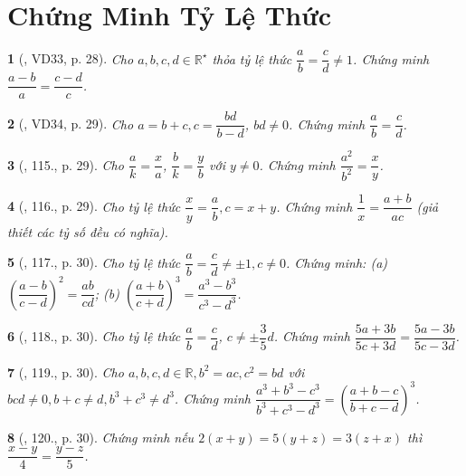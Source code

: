\documentclass{article}
\newtheorem{baitoan}{}
\begin{document}
\section{Chứng Minh Tỷ Lệ Thức}

\begin{baitoan}[\cite{Tuyen_Toan_7}, VD33, p. 28]
	Cho $a,b,c,d\in\mathbb{R}^\star$ thỏa tỷ lệ thức $\dfrac{a}{b} = \dfrac{c}{d}\ne 1$. Chứng minh $\dfrac{a - b}{a} = \dfrac{c - d}{c}$.
\end{baitoan}

\begin{baitoan}[\cite{Tuyen_Toan_7}, VD34, p. 29]
	Cho $a = b + c,c = \dfrac{bd}{b - d}$, $bd\ne 0$. Chứng minh $\dfrac{a}{b} = \dfrac{c}{d}$.
\end{baitoan}

\begin{baitoan}[\cite{Tuyen_Toan_7}, 115., p. 29]
	Cho $\dfrac{a}{k} = \dfrac{x}{a}$, $\dfrac{b}{k} = \dfrac{y}{b}$ với $y\ne 0$. Chứng minh $\dfrac{a^2}{b^2} = \dfrac{x}{y}$.
\end{baitoan}

\begin{baitoan}[\cite{Tuyen_Toan_7}, 116., p. 29]
	Cho tỷ lệ thức $\dfrac{x}{y} = \dfrac{a}{b},c = x + y$. Chứng minh $\dfrac{1}{x} = \dfrac{a + b}{ac}$ (giả thiết các tỷ số đều có nghĩa).
\end{baitoan}

\begin{baitoan}[\cite{Tuyen_Toan_7}, 117., p. 30]
	Cho tỷ lệ thức $\dfrac{a}{b} = \dfrac{c}{d}\ne\pm 1,c\ne 0$. Chứng minh: (a) $\left(\dfrac{a - b}{c - d}\right)^2 = \dfrac{ab}{cd}$;
	(b) $\left(\dfrac{a + b}{c + d}\right)^3 = \dfrac{a^3 - b^3}{c^3 - d^3}$.	
\end{baitoan}

\begin{baitoan}[\cite{Tuyen_Toan_7}, 118., p. 30]
	Cho tỷ lệ thức $\dfrac{a}{b} = \dfrac{c}{d}$, $c\ne\pm\dfrac{3}{5}d$. Chứng minh $\dfrac{5a + 3b}{5c + 3d} = \dfrac{5a - 3b}{5c - 3d}$.
\end{baitoan}

\begin{baitoan}[\cite{Tuyen_Toan_7}, 119., p. 30]
	Cho $a,b,c,d\in\mathbb{R},b^2 = ac,c^2 = bd$ với $bcd\ne 0,b + c\ne d,b^3 + c^3\ne d^3$. Chứng minh $\dfrac{a^3 + b^3 - c^3}{b^3 + c^3 - d^3} = \left(\dfrac{a + b - c}{b + c - d}\right)^3$.
\end{baitoan}

\begin{baitoan}[\cite{Tuyen_Toan_7}, 120., p. 30]
	Chứng minh nếu $2(x + y) = 5(y + z) = 3(z + x)$ thì $\dfrac{x - y}{4} = \dfrac{y - z}{5}$.
\end{baitoan}
\end{document}
